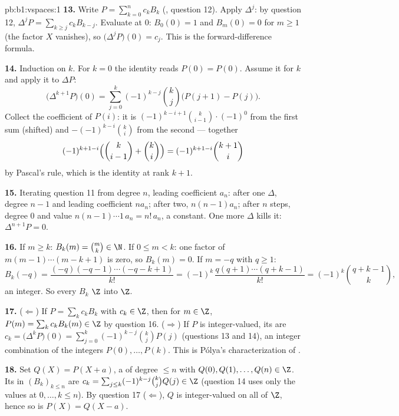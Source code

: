 \begin{solution}{pb:b1:vspaces:1}
\textbf{13.} Write $P = \sum_{k=0}^{n} c_k B_k$ (, question
12). Apply $\Delta^{j}$: by question 12, $\Delta^{j} P = \sum_{k
\geq j} c_k B_{k-j}$. Evaluate at $0$: $B_0(0) = 1$ and $B_m(0) =
0$ for $m \geq 1$ (the factor $X$ vanishes), so
$\bigl(\Delta^{j}P\bigr)(0) = c_j$. This is the forward-difference
formula.

\textbf{14.} Induction on $k$. For $k = 0$ the identity reads
$P(0) = P(0)$. Assume it for $k$ and apply it to $\Delta P$:
\[
\bigl(\Delta^{k+1} P\bigr)(0)
= \sum_{j=0}^{k} (-1)^{k-j}\binom kj \bigl(P(j+1) - P(j)\bigr).
\]
Collect the coefficient of $P(i)$: it is $(-1)^{k-i+1}\binom
k{i-1}\cdot(-1)^{0}$ from the first sum (shifted) and
$-(-1)^{k-i}\binom ki$ from the second --- together
\[
(-1)^{k+1-i}\Bigl(\binom k{i-1} + \binom ki\Bigr)
= (-1)^{k+1-i}\binom{k+1}i
\]
by Pascal's rule, which is the identity at rank $k + 1$.

\textbf{15.} Iterating question 11 from degree $n$, leading
coefficient $a_n$: after one $\Delta$, degree $n-1$ and leading
coefficient $n a_n$; after two, $n(n-1)a_n$; after $n$ steps,
degree $0$ and value $n(n-1)\cdots 1\, a_n = n!\,a_n$, a constant.
One more $\Delta$ kills it: $\Delta^{n+1}P = 0$.

\textbf{16.} If $m \geq k$: $B_k(m) = \binom mk \in \N$. If $0
\leq m < k$: one factor of $m(m-1)\cdots(m-k+1)$ is zero, so
$B_k(m) = 0$. If $m = -q$ with $q \geq 1$:
\[
B_k(-q) = \frac{(-q)(-q-1)\cdots(-q-k+1)}{k!}
= (-1)^k\,\frac{q(q+1)\cdots(q+k-1)}{k!}
= (-1)^k \binom{q+k-1}{k},
\]
an integer. So every $B_k$  $\Z$ into $\Z$.

\textbf{17.} ($\Leftarrow$) If $P = \sum_k c_k B_k$ with $c_k \in
\Z$, then for $m \in \Z$, $P(m) = \sum_k c_k B_k(m) \in \Z$ by
question 16. ($\Rightarrow$) If $P$ is integer-valued, its
 are $c_k = \bigl(\Delta^k P\bigr)(0) = \sum_{j=0}^k
(-1)^{k-j}\binom kj P(j)$ (questions 13 and 14), an integer
combination of the integers $P(0), \dots, P(k)$. This is
P\'olya's characterization of .

\textbf{18.} Set $Q(X) = P(X + a)$, a  of degree $\leq
n$ with $Q(0), Q(1), \dots, Q(n) \in \Z$. Its  in
$(B_k)_{k \leq n}$ are $c_k = \sum_{j \leq k}(-1)^{k-j}\binom kj
Q(j) \in \Z$ (question 14 uses only the values at $0, \dots, k
\leq n$). By question 17 ($\Leftarrow$), $Q$ is integer-valued on
all of $\Z$, hence so is $P(X) = Q(X - a)$.


\end{solution}
